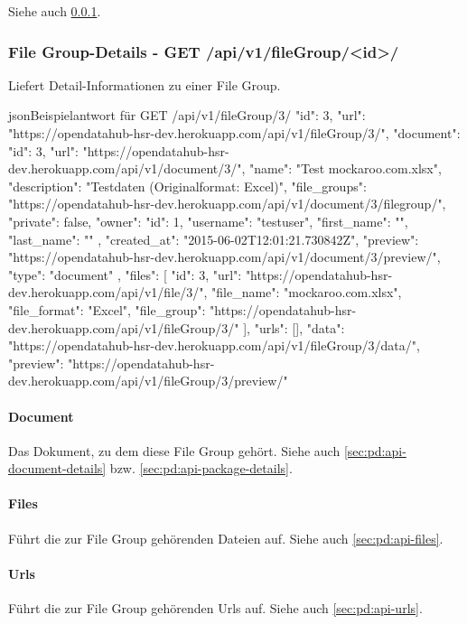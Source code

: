 Siehe auch \cref{sec:pd:api-filegroup-detail}.

\subsubsection{File Group-Details - GET /api/v1/fileGroup/<id>/} \label{sec:pd:api-filegroup-detail}
Liefert Detail-Informationen zu einer File Group.

\begin{srclst}{json}{Beispielantwort für GET /api/v1/fileGroup/3/}
{
    "id": 3, 
    "url": "https://opendatahub-hsr-dev.herokuapp.com/api/v1/fileGroup/3/", 
    "document": {
        "id": 3, 
        "url": "https://opendatahub-hsr-dev.herokuapp.com/api/v1/document/3/", 
        "name": "Test mockaroo.com.xlsx", 
        "description": "Testdaten (Originalformat: Excel)", 
        "file_groups": "https://opendatahub-hsr-dev.herokuapp.com/api/v1/document/3/filegroup/", 
        "private": false, 
        "owner": {
            "id": 1, 
            "username": "testuser", 
            "first_name": "", 
            "last_name": ""
        }, 
        "created_at": "2015-06-02T12:01:21.730842Z", 
        "preview": "https://opendatahub-hsr-dev.herokuapp.com/api/v1/document/3/preview/", 
        "type": "document"
    }, 
    "files": [
        {
            "id": 3, 
            "url": "https://opendatahub-hsr-dev.herokuapp.com/api/v1/file/3/", 
            "file_name": "mockaroo.com.xlsx", 
            "file_format": "Excel", 
            "file_group": "https://opendatahub-hsr-dev.herokuapp.com/api/v1/fileGroup/3/"
        }
    ], 
    "urls": [], 
    "data": "https://opendatahub-hsr-dev.herokuapp.com/api/v1/fileGroup/3/data/", 
    "preview": "https://opendatahub-hsr-dev.herokuapp.com/api/v1/fileGroup/3/preview/"
}
\end{srclst}

\paragraph{Document} Das Dokument, zu dem diese File Group gehört. Siehe auch \cref{sec:pd:api-document-details} bzw. \cref{sec:pd:api-package-details}.
\paragraph{Files} Führt die zur File Group gehörenden Dateien auf. Siehe auch \cref{sec:pd:api-files}.
\paragraph{Urls} Führt die zur File Group gehörenden Urls auf. Siehe auch \cref{sec:pd:api-urls}.
